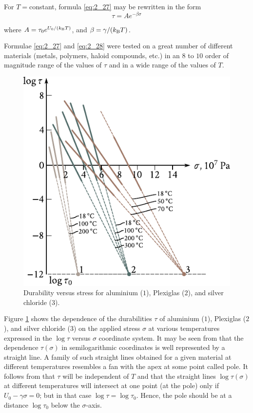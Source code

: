 For $T = $constant, formula \eqref{eq:2_27} may be rewritten in the form
\begin{equation}\label{eq:2_28}
	\tau = A e^{-\beta\sigma}
\end{equation}

\noindent
where $A=\tau_0 e^{U_0/(k_{\text{B}} T)}$, and $\beta=\gamma/(k_{\text{B}} T)$.

Formulae \eqref{eq:2_27} and \eqref{eq:2_28} were tested on a great number of different materials (metals, polymers, haloid compounds, etc.) in an $8$ to $10$ order of magnitude range of the values of $\tau$ and in a wide range of the values of $T$.

\begin{figure}[t]
	\begin{center}
		\includegraphics[scale=1.0]{figures/ch_02/fig_2_29.pdf}
		\caption[]{Durability versus stress for aluminium ($1$), Plexiglas ($2$), and silver chloride ($3$).}
		\label{fig:2_29}
	\end{center}
	\vspace{-0.7cm}
\end{figure}

Figure \ref{fig:2_29} shows the dependence of the durabilities $\tau$ of aluminium ($1$), Plexiglas ($2$), and silver chloride ($3$) on the applied stress $\sigma$ at various temperatures expressed in the $\log{\tau}$ versus $\sigma$ coordinate system. It may be seen from  that the dependence $\tau(\sigma)$ in semilogarithmic coordinates is well represented by a straight line. A family of such straight lines obtained for a given material at different temperatures resembles a fan with the apex at some point called pole.
It follows from  that $\tau$ will be independent of $T$ and that the straight lines $\log{\tau(\sigma)}$ at different temperatures will intersect at one point (at the pole) only if $U_0-\gamma\sigma=0$; but in that case $\log{\tau}=\log{\tau_0}$. Hence, the pole should be at a distance $\log{\tau_0}$ below the $\sigma$-axis.

